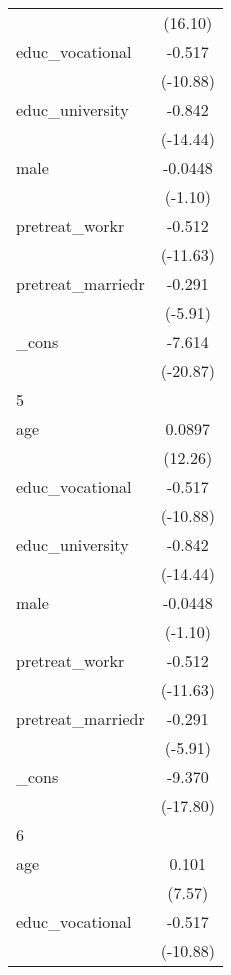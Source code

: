 {\begin{tabular}{l*{1}{c}}
            &     (16.10)         \\
[1em]
educ\_vocational&      -0.517\sym{***}\\
            &    (-10.88)         \\
[1em]
educ\_university&      -0.842\sym{***}\\
            &    (-14.44)         \\
[1em]
male        &     -0.0448         \\
            &     (-1.10)         \\
[1em]
pretreat\_workr&      -0.512\sym{***}\\
            &    (-11.63)         \\
[1em]
pretreat\_marriedr&      -0.291\sym{***}\\
            &     (-5.91)         \\
[1em]
\_cons      &      -7.614\sym{***}\\
            &    (-20.87)         \\
\hline
5           &                     \\
age         &      0.0897\sym{***}\\
            &     (12.26)         \\
[1em]
educ\_vocational&      -0.517\sym{***}\\
            &    (-10.88)         \\
[1em]
educ\_university&      -0.842\sym{***}\\
            &    (-14.44)         \\
[1em]
male        &     -0.0448         \\
            &     (-1.10)         \\
[1em]
pretreat\_workr&      -0.512\sym{***}\\
            &    (-11.63)         \\
[1em]
pretreat\_marriedr&      -0.291\sym{***}\\
            &     (-5.91)         \\
[1em]
\_cons      &      -9.370\sym{***}\\
            &    (-17.80)         \\
\hline
6           &                     \\
age         &       0.101\sym{***}\\
            &      (7.57)         \\
[1em]
educ\_vocational&      -0.517\sym{***}\\
            &    (-10.88)         \\

\end{tabular}}
